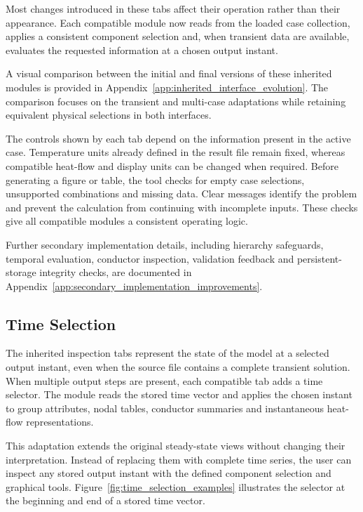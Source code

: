 Most changes introduced in these tabs affect their operation rather than
their appearance. Each compatible module now reads from the loaded case
collection, applies a consistent component selection and, when transient data are
available, evaluates the requested information at a chosen output instant.

\begin{samepage}

A visual comparison between the initial and final versions of these
inherited modules is provided in
Appendix~\ref{app:inherited_interface_evolution}. The comparison focuses on
the transient and multi-case adaptations while retaining equivalent physical
selections in both interfaces.

The controls shown by each tab depend on the information present in the
active case. Temperature units already defined in the result file remain
fixed, whereas compatible heat-flow and display units can be changed when
required. Before generating a figure or table, the tool checks for empty case
selections, unsupported combinations and missing data. Clear messages identify
the problem and prevent the calculation from continuing with incomplete
inputs. These checks give all compatible modules a consistent operating logic.

Further secondary implementation details, including hierarchy safeguards,
temporal evaluation, conductor inspection, validation feedback and
persistent-storage integrity checks, are documented in
Appendix~\ref{app:secondary_implementation_improvements}.

\end{samepage}

\subsection{Time Selection}
\label{subsec:time_selection}

The inherited inspection tabs represent the state of the model at a selected
output instant, even when the source file contains a complete transient
solution. When multiple output steps are present, each compatible tab adds a 
time selector. The module reads the stored time vector and applies the chosen 
instant to group attributes, nodal tables, conductor summaries and instantaneous heat-flow
representations.

This adaptation extends the original steady-state views without changing
their interpretation. Instead of replacing them with complete time series,
the user can inspect any stored output instant with the defined component
selection and graphical tools.
Figure~\ref{fig:time_selection_examples} illustrates the selector at the
beginning and end of a stored time vector.

